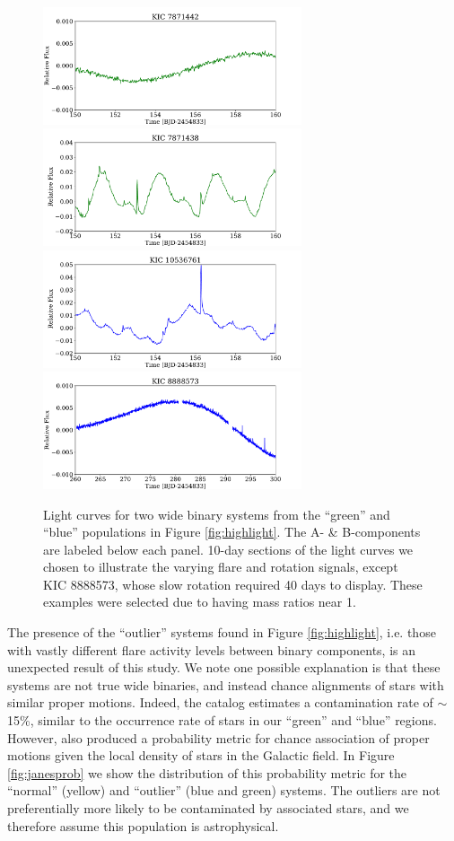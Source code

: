 \documentclass[preprint2]{aastex61}
\begin{document}
\begin{figure}[ht]
        \centering
  	\includegraphics[width=3in]{lc1}
	\includegraphics[width=3in]{lc2}
	\includegraphics[width=3in]{lc3}
	\includegraphics[width=3in]{lc4}
        \caption{ Light curves for two wide binary systems from the ``green'' and ``blue'' populations in Figure \ref{fig:highlight}. The A- \& B-components are labeled below each panel. 10-day sections of the light curves we chosen to illustrate the varying flare and rotation signals, except KIC 8888573, whose slow rotation required 40 days to display. These examples were selected due to having mass ratios near 1.} 
    \label{fig:lc}
\end{figure}



The presence of the ``outlier'' systems found in Figure \ref{fig:highlight}, i.e. those with vastly different flare activity levels between binary components, is an unexpected result of this study. We note one possible explanation is that these systems are not true wide binaries, and instead chance alignments of stars with similar proper motions. Indeed, the \citet{janes2017} catalog estimates a contamination rate of $\sim$15\%, similar to the occurrence rate of stars in our ``green'' and ``blue'' regions. However, \citet{janes2017} also produced a probability metric for chance association of proper motions given the local density of stars in the  Galactic field. In Figure \ref{fig:janesprob} we show the distribution of this probability metric for the ``normal'' (yellow) and ``outlier'' (blue and green) systems. The outliers are not preferentially more likely to be contaminated by associated stars, and we therefore assume this population is astrophysical.
\end{document}

